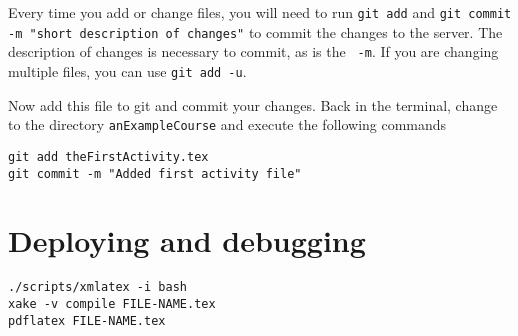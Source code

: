 \documentclass{ximera}
\begin{document}
Every time you add or change files, you will need to run \verb!git add!
and
\verb!git commit -m "short description of changes"! to commit the
changes to
the server. The description of changes is necessary to commit, as is
the
\verb! -m!. If you are changing multiple files, you can use
\verb!git add -u!.



Now add this file to git and commit your changes. Back in the terminal,
change to the directory \verb!anExampleCourse!
and execute the following commands
\begin{verbatim}
git add theFirstActivity.tex
git commit -m "Added first activity file"
\end{verbatim}

\section{Deploying and debugging}


\begin{verbatim}
./scripts/xmlatex -i bash
xake -v compile FILE-NAME.tex
pdflatex FILE-NAME.tex
\end{verbatim}
\end{document}
